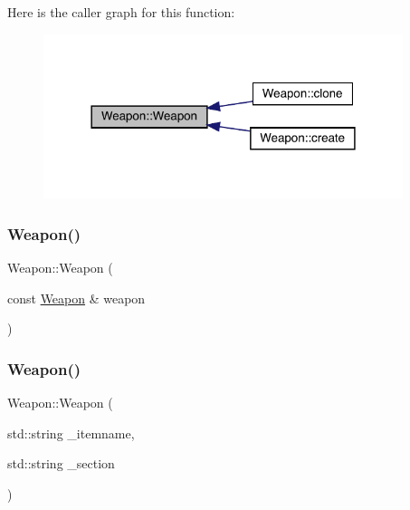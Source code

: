 Here is the caller graph for this function\+:
\nopagebreak
\begin{figure}[H]
\begin{center}
\leavevmode
\includegraphics[width=298pt]{db/de5/class_weapon_a42dbc46dd70319a24763992c4ebbd396_icgraph}
\end{center}
\end{figure}
\mbox{\label{class_weapon_a167d8c34946b69123ddbb3ce7d739358}} 
\subsubsection{\texorpdfstring{Weapon()}{Weapon()}\hspace{0.1cm}{\footnotesize\ttfamily [3/4]}}
{\footnotesize\ttfamily Weapon\+::\+Weapon (\begin{DoxyParamCaption}\item[{const \mbox{\hyperlink{class_weapon}{Weapon}} \&}]{weapon }\end{DoxyParamCaption})}

\mbox{\label{class_weapon_a43fa490f1c719993d54294f1c3cf5f50}} 
\subsubsection{\texorpdfstring{Weapon()}{Weapon()}\hspace{0.1cm}{\footnotesize\ttfamily [4/4]}}
{\footnotesize\ttfamily Weapon\+::\+Weapon (\begin{DoxyParamCaption}\item[{std\+::string}]{\+\_\+itemname,  }\item[{std\+::string}]{\+\_\+section }\end{DoxyParamCaption})}



